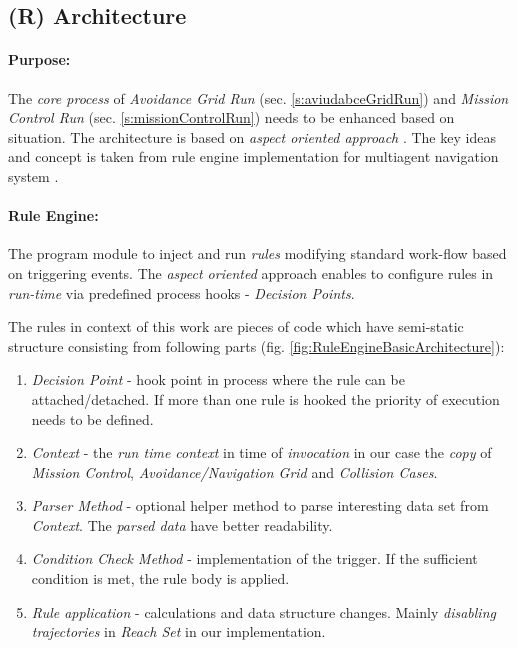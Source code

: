 \subsection{(R) Architecture}\label{s:RuleEngineArchitecture}

\paragraph{Purpose:} The \emph{core process} of \emph{Avoidance Grid Run} (sec. \ref{s:aviudabceGridRun}) and \emph{Mission Control Run} (sec. \ref{s:missionControlRun}) needs to be enhanced based on  situation. The architecture is based on \emph{aspect oriented approach} \cite{hill2003jess}. The key ideas and concept is taken from rule engine implementation for multiagent  navigation system \cite{seyboth2013event}.

\paragraph{Rule Engine:} The program module to inject and run \emph{rules} modifying standard work-flow based on  triggering events. The \emph{aspect oriented} approach enables to configure rules in \emph{run-time} via predefined process hooks - \emph{Decision Points}. 

The rules in context of this work are pieces of code which have semi-static structure consisting from following parts (fig. \ref{fig:RuleEngineBasicArchitecture}):

\begin{enumerate}
    \item \emph{Decision Point} - hook point in process where the rule can be attached/detached. If more than one rule is hooked the priority of execution needs to be defined. 
    
    \item \emph{Context} - the \emph{run time context} in time of \emph{invocation} in our case the \emph{copy} of \emph{Mission Control}, \emph{Avoidance/Navigation Grid} and \emph{Collision Cases}.
    
    \item \emph{Parser Method} - optional helper method to parse interesting data set from \emph{Context}. The \emph{parsed data} have better readability.
    
    \item \emph{Condition Check Method} - implementation of the trigger. If the sufficient condition is met, the rule body is applied.
    
    \item \emph{Rule application} - calculations and data structure changes. Mainly \emph{disabling trajectories} in \emph{Reach Set} in our implementation.     
\end{enumerate}

